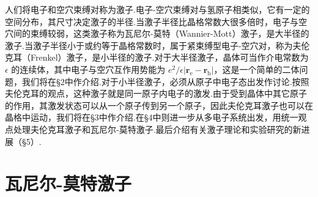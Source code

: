 人们将电子和空穴束缚对称为激子.电子-空穴束缚对与氢原子相类似，它有一定的空间分布，其尺寸决定激子的半径.当激子半径比晶格常数大很多倍时，电子与空穴间的束缚较弱，这类激子称为瓦尼尔-莫特（Wannier-Mott）激子，是大半径的激子.当激子半径小于或约等于晶格常数时，属于紧束缚型电子-空穴对，称为夫伦克耳（Frenkel）激子，是小半径的激子.对于大半径激子，晶体可当作介电常数为 $\epsilon$ 的连续体，其中电子与空穴互作用势能为 $e^{2}/\epsilon|\boldsymbol{r}_{\mathrm{e}}-\boldsymbol{r}_{\mathrm{h}}|$，这是一个简单的二体问题，我们将在§2中作介绍.对于小半径激子，必须从原子中电子态出发作讨论.按照夫伦克耳的观点，这种激子就是同一原子内电子的激发.由于受到晶体中其它原子的作用，其激发状态可以从一个原子传到另一个原子，因此夫伦克耳激子也可以在晶格中运动，我们将在§3中作介绍.在§4中则进一步从多电子系统出发，用统一观点处理夫伦克耳激子和瓦尼尔-莫特激子.最后介绍有关激子理论和实验研究的新进展（§5）.

\section{瓦尼尔-莫特激子}

